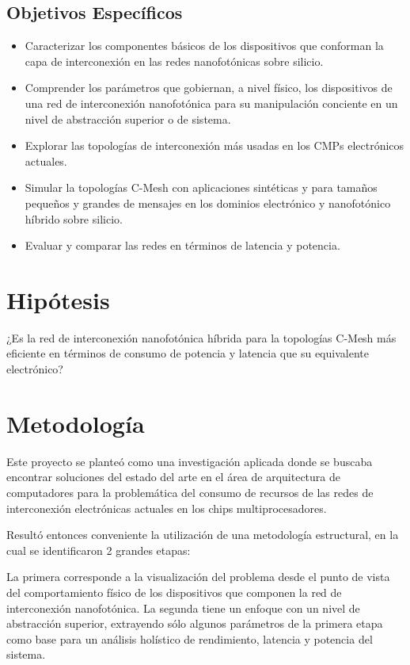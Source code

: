 \subsection{Objetivos Específicos}
\begin{itemize}
\item Caracterizar los componentes básicos de los dispositivos que conforman la
capa de interconexión en las redes nanofotónicas sobre silicio.
\item Comprender los parámetros que gobiernan, a nivel físico, los dispositivos 
de una red de interconexión nanofotónica para su manipulación conciente en
 un nivel de abstracción superior o de sistema.
\item Explorar las topologías de interconexión más usadas en los CMPs electrónicos actuales.
\item Simular la topologías C-Mesh con aplicaciones sintéticas y
para tamaños pequeños y grandes de mensajes en los dominios electrónico y 
nanofotónico híbrido sobre silicio.
\item Evaluar y comparar las redes en términos de latencia y potencia.
\end{itemize} 

\section{Hipótesis}
¿Es la red de interconexión nanofotónica híbrida para la
topologías C-Mesh más eficiente en términos de consumo de potencia
 y latencia que su equivalente electrónico?

\section{Metodología}
Este proyecto se planteó como una investigación aplicada donde se buscaba 
encontrar soluciones del estado del arte en el área de arquitectura de 
computadores para la problemática del consumo de recursos de las redes de 
interconexión electrónicas actuales en los chips multiprocesadores. 

Resultó entonces conveniente la utilización de una metodología estructural, 
en la cual se identificaron 2 grandes etapas: 

La primera corresponde
a la visualización del problema desde el punto de vista del comportamiento físico de
los dispositivos que componen la red de interconexión nanofotónica. 
La segunda tiene un enfoque con un nivel de abstracción superior, extrayendo
sólo algunos parámetros de la primera etapa como base para un análisis holístico de rendimiento,
latencia y potencia del sistema.

